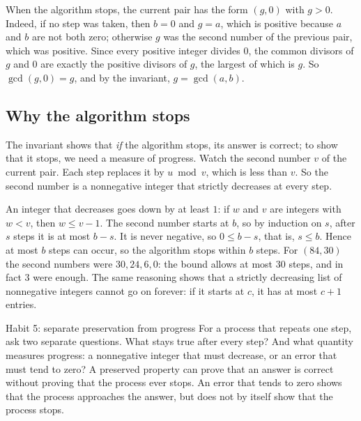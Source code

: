 When the algorithm stops, the current pair has the form $(g,0)$ with $g>0$. Indeed, if no step was taken, then $b=0$ and $g=a$, which is positive because $a$ and $b$ are not both zero; otherwise $g$ was the second number of the previous pair, which was positive. Since every positive integer divides $0$, the common divisors of $g$ and $0$ are exactly the positive divisors of $g$, the largest of which is $g$. So $\gcd(g,0)=g$, and by the invariant, $g=\gcd(a,b)$.

\subsection*{Why the algorithm stops}
The invariant shows that \emph{if} the algorithm stops, its answer is correct; to show that it stops, we need a measure of progress. Watch the second number $v$ of the current pair. Each step replaces it by $u\bmod v$, which is less than $v$. So the second number is a nonnegative integer that strictly decreases at every step.

An integer that decreases goes down by at least $1$: if $w$ and $v$ are integers with $w<v$, then $w\le v-1$. The second number starts at $b$, so by induction on $s$, after $s$ steps it is at most $b-s$. It is never negative, so $0\le b-s$, that is, $s\le b$. Hence at most $b$ steps can occur, so the algorithm stops within $b$ steps. For $(84,30)$ the second numbers were $30,24,6,0$: the bound allows at most $30$ steps, and in fact $3$ were enough. The same reasoning shows that a strictly decreasing list of nonnegative integers cannot go on forever: if it starts at $c$, it has at most $c+1$ entries.


\begin{principle}{Habit 5: separate preservation from progress}
For a process that repeats one step, ask two separate questions. What stays true after every step? And what quantity measures progress: a nonnegative integer that must decrease, or an error that must tend to zero? A preserved property can prove that an answer is correct without proving that the process ever stops. An error that tends to zero shows that the process approaches the answer, but does not by itself show that the process stops.
\end{principle}
